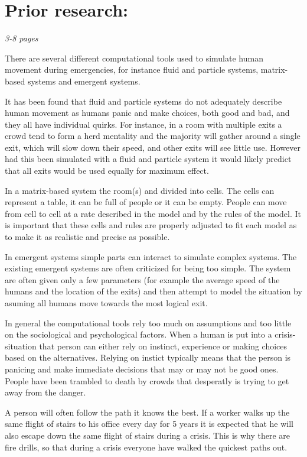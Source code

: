 \chapter{Prior research:}
\label{ch:prior}
\textit{3-8 pages}

There are several different computational tools used to simulate human movement during emergencies, 
for instance fluid and particle systems, matrix-based systems and emergent systems. 

It has been found that fluid and particle systems do not adequately describe human movement as humans 
panic and make choices, both good and bad, and they all have individual quirks. For instance, in a room with 
multiple exits a crowd tend to form a herd mentality and the majority will gather around a single exit, which 
will slow down their speed, and other exits will see little use. However had this been simulated with a fluid 
and particle system it would likely predict that all exits would be used equally for maximum effect.

In a matrix-based system the room(s) and divided into cells. The cells can represent a table, it can be full of 
people or it can be empty. People can move from cell to cell at a rate described in the model and by the 
rules of the model. It is important that these cells and rules are properly adjusted to fit each model as to 
make it as realistic and precise as possible.

In emergent systems simple parts can interact to simulate complex systems. The existing emergent systems 
are often criticized for being too simple. The system are often given only a few parameters (for example the 
average speed of the humans and the location of the exits) and then attempt to model the situation by 
asuming all humans move towards the most logical exit.

In general the computational tools rely too much on assumptions and too little on the sociological and psychological 
factors. When a human is put into a crisis-situation that person can either rely on instinct, experience or making 
choices based on the alternatives. Relying on instict typically means that the person is panicing and make immediate 
decisions that may or may not be good ones. People have been trambled to death by crowds that desperatly is trying 
to get away from the danger.

A person will often follow the path it knows the best. If a worker walks up the same flight of stairs to his office 
every day for 5 years it is expected that he will also escape down the same flight of stairs during a crisis. This 
is why there are fire drills, so that during a crisis everyone have walked the quickest paths out.

